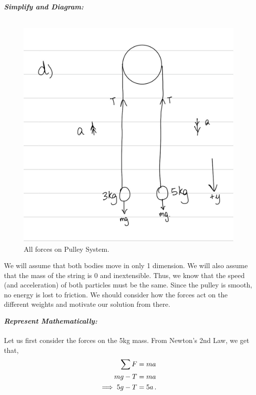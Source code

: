 \begin{subquestions}
	
	\textbf{\textit{Simplify and Diagram:}} \\ \\
	\begin{figure}[H]
		\begin{center}
			\includegraphics[scale=0.25]{../2015/figures/2015q6-4}
			\caption{\label{2015:q66:fig:Diagram4} All forces on Pulley System.}
		\end{center}
	\end{figure}
	We will assume that both bodies move in only 1 dimension. We will also assume that the mass of the string is 0 and inextensible. Thus, we know that the speed (and acceleration) of both particles must be the same. Since the pulley is smooth, no energy is lost to friction. We should consider how the forces act on the different weights and motivate our solution from there.
	
	
	
	
	\textbf{\textit{Represent Mathematically:}} \\ \\
	Let us first consider the forces on the 5kg mass. From Newton's 2nd Law, we get that,
	\begin{align}
		\sum F & = ma \nonumber \\
		mg - T & = ma \nonumber \\
		\implies 5g-T & = 5a \,. \label{2015:q66:PulleyEq1}
	\end{align}
	

\end{subquestions}
